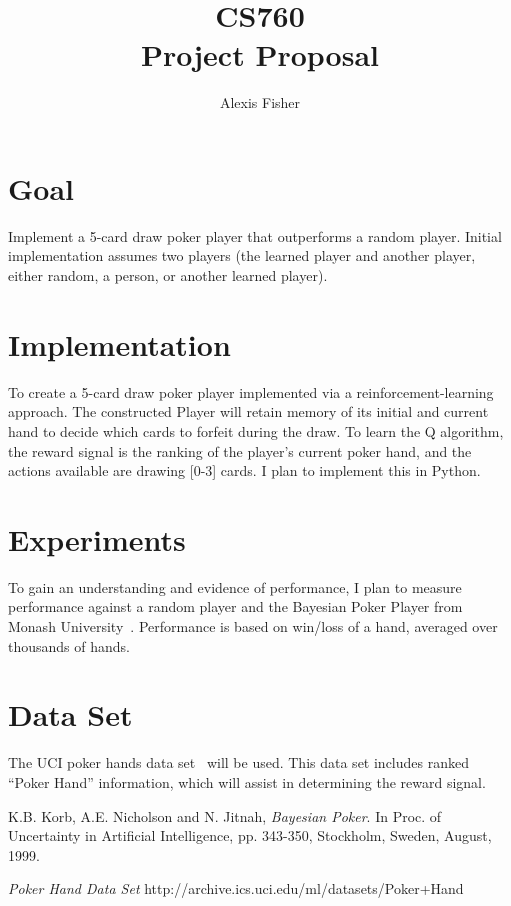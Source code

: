\documentclass[]{article}
\title{CS760 \\ Project Proposal}
\author{  Alexis Fisher }
\begin{document}
\ifpdf
{}
\else
{}
\fi

\maketitle



\section{Goal}
Implement a 5-card draw poker player that outperforms a random player. Initial implementation assumes two players (the learned player and another player, either random, a person, or another learned player). 

\section{Implementation}
To create a 5-card draw poker player implemented via a reinforcement-learning approach.  The constructed Player will retain memory of its initial and current hand to decide which cards to forfeit during the draw. To learn the Q algorithm, the reward signal is the ranking of the player's current poker hand, and the actions available are drawing [0-3] cards. I plan to implement this in Python.

\section{Experiments}
To gain an understanding and evidence of performance, I plan to measure performance against a random player and the Bayesian Poker Player from Monash University~\cite{korb99}. Performance is based on win/loss of a hand, averaged over thousands of hands.  

\section{Data Set}
The UCI poker hands data set~\cite{pokerdata} will be used. This data set includes ranked ``Poker Hand'' information, which will assist in determining the reward signal. 


%
\begin{thebibliography}{9}
K.B. Korb, A.E. Nicholson and N. Jitnah,
 \emph{Bayesian Poker}. 
In Proc. of Uncertainty in Artificial Intelligence, pp. 343-350, 
Stockholm, Sweden, August, 1999.

\emph{Poker Hand Data Set}
http://archive.ics.uci.edu/ml/datasets/Poker+Hand
\end{thebibliography}
\end{document}
